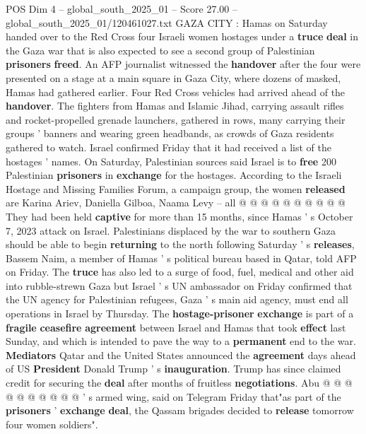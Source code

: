 \begin{textsample}{POS Dim 4 – global\_south\_2025\_01 – Score 27.00 – global\_south\_2025\_01/120461027.txt}  \label{ex:f4_pos_009}
GAZA CITY : Hamas on Saturday handed over to the Red Cross four Israeli women hostages under a \textbf{truce} \textbf{deal} in the Gaza war that is also expected to see a second group of Palestinian \textbf{prisoners} \textbf{freed}.
An AFP journalist witnessed the \textbf{handover} after the four were presented on a stage at a main square in Gaza City, where dozens of masked, Hamas had gathered earlier.
Four Red Cross vehicles had arrived ahead of the \textbf{handover}.
The fighters from Hamas and Islamic Jihad, carrying assault rifles and rocket-propelled grenade launchers, gathered in rows, many carrying their groups ' banners and wearing green headbands, as crowds of Gaza residents gathered to watch.
Israel confirmed Friday that it had received a list of the hostages ' names.
On Saturday, Palestinian sources said Israel is to \textbf{free} 200 Palestinian \textbf{prisoners} in \textbf{exchange} for the hostages.
According to the Israeli Hostage and Missing Families Forum, a campaign group, the women \textbf{released} are Karina Ariev, Daniella Gilboa, Naama Levy -- all @ @ @ @ @ @ @ @ @ @ They had been held \textbf{captive} for more than 15 months, since Hamas ' s October 7, 2023 attack on Israel.
Palestinians displaced by the war to southern Gaza should be able to begin \textbf{returning} to the north following Saturday ' s \textbf{releases}, Bassem Naim, a member of Hamas ' s political bureau based in Qatar, told AFP on Friday.
The \textbf{truce} has also led to a surge of food, fuel, medical and other aid into rubble-strewn Gaza but Israel ' s UN ambassador on Friday confirmed that the UN agency for Palestinian refugees, Gaza ' s main aid agency, must end all operations in Israel by Thursday.
The \textbf{hostage-prisoner} \textbf{exchange} is part of a \textbf{fragile} \textbf{ceasefire} \textbf{agreement} between Israel and Hamas that took \textbf{effect} last Sunday, and which is intended to pave the way to a \textbf{permanent} end to the war. \textbf{Mediators} Qatar and the United States announced the \textbf{agreement} days ahead of US \textbf{President} Donald Trump ' s \textbf{inauguration}.
Trump has since claimed credit for securing the \textbf{deal} after months of fruitless \textbf{negotiations}.
Abu @ @ @ @ @ @ @ @ @ @ ' s armed wing, said on Telegram Friday that"as part of the \textbf{prisoners} ' \textbf{exchange} \textbf{deal}, the Qassam brigades decided to \textbf{release} tomorrow four women soldiers".

\end{textsample}

